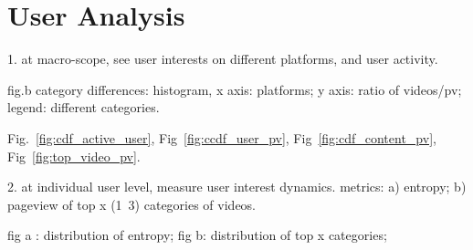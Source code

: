 \section{User Analysis}

1. at macro-scope, see user interests on different platforms, and user activity.


fig.b category differences: histogram, x axis: platforms; y axis:
ratio of videos/pv; legend: different categories.

Fig.~\ref{fig:cdf_active_user}, Fig~\ref{fig:ccdf_user_pv},
Fig~\ref{fig:cdf_content_pv}, Fig~\ref{fig:top_video_pv}. 

2. at individual user level, measure user interest dynamics. metrics:
a) entropy; b) pageview of top x (1~3) categories of videos.

fig a : distribution of entropy;
fig b: distribution of top x categories;


